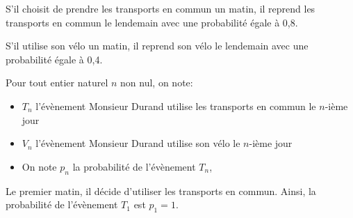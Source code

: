 \medskip




S'il choisit de prendre les transports en commun un matin, il reprend les transports en
commun le lendemain avec une probabilité égale à 0,8.

S'il utilise son vélo un matin, il reprend son vélo le lendemain avec une probabilité égale
à 0,4.

\medskip

Pour tout entier naturel $n$ non nul, on note:
\begin{itemize}
\item  $T_n$ l'évènement \og Monsieur Durand utilise les transports en commun le $n$-ième jour\fg
\item  $V_n$ l'évènement \og  Monsieur Durand utilise son vélo le $n$-ième jour\fg
\item On note $p_n$ la probabilité de l'évènement $T_n$,
\end{itemize}

Le premier matin, il décide d'utiliser les transports en commun. Ainsi, la probabilité de
l'évènement $T_1$ est $p_1 = 1$.

